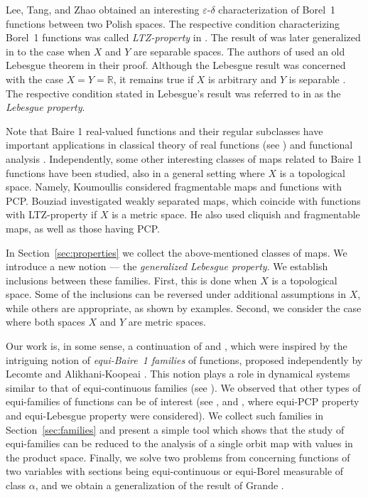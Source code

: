 \documentclass[a4paper]{amsart}
\theoremstyle{plain}
\theoremstyle{definition}
\theoremstyle{remark}
\numberwithin{equation}{section}
\newcommand{\R}{\mathbb R}
\begin{document}
Lee, Tang, and Zhao \cite{LTZ} obtained an interesting 
$\varepsilon$-$\delta$ characterization of Borel~1 functions between two Polish spaces.
The respective condition characterizing Borel~1 functions was called \emph{LTZ-property} in \cite{BHH}.
The result of \cite{LTZ} was later generalized in \cite{FC} to the case when $X$ and $Y$ are separable spaces. The authors of \cite {FC} used an old Lebesgue theorem \cite{Leb} in their proof. Although the Lebesgue result was concerned with the case $X=Y=\R$, it remains true if $X$ is arbitrary and $Y$ is separable \cite[Thm 2.1]{BHH}. The respective condition stated in Lebesgue's
result was referred to in \cite{BHH} as the \emph{Lebesgue property}.

Note that Baire 1 real-valued functions and their regular subclasses have important applications in classical theory of real functions (see \cite{Br}) and functional analysis \cite {HOR}. Independently, some other interesting classes of maps related to Baire 1 functions have been studied, also in a general setting where $X$ is a topological space. Namely, Koumoullis \cite{Kou} considered fragmentable maps and functions with PCP. Bouziad \cite{Bou} investigated weakly separated maps, which coincide with functions with LTZ-property if $X$ is a metric space. He also used cliquish and fragmentable maps, as well as those having PCP. 

In Section~\ref{sec:properties}
we collect the above-mentioned classes of maps. We introduce a new notion --- the \emph{generalized
Lebesgue property}. We establish inclusions between these families. First, this is done when $X$ is a topological space. Some of the inclusions can be reversed under additional assumptions in $X$, while others  are appropriate, as shown by examples. Second, we consider the case where both spaces $X$ and $Y$ are metric spaces.

Our work is, in some sense, a continuation of \cite{BKS} and \cite{BHH}, which were inspired by the intriguing notion of \emph{equi-Baire~1 families} of functions, proposed independently by Lecomte \cite{Le} and Alikhani-Koopeai \cite{A1}. This notion plays a role in dynamical systems similar to that of equi-continuous families (see \cite{A2}). We observed that other types of equi-families of functions can be of interest
(see \cite{GM}, \cite{Gr}  and \cite{BHH}, where equi-PCP property and equi-Lebesgue property were considered).
We collect such families in Section~\ref{sec:families} and present a simple tool which shows that the study of equi-families can be reduced to the analysis of a single orbit map with values in the product space.
Finally, we solve two problems from \cite{BKS} concerning functions of two variables with sections being equi-continuous or equi-Borel measurable of class $\alpha$, and we obtain a generalization of the result of Grande \cite{Gr}.
\end{document}

